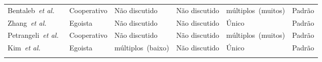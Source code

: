 \begin{table}[htb]
\begin{tabular}{p{2.8cm}p{2cm}p{2.3cm}p{2.2cm}p{2.3cm}p{2cm}}
    Bentaleb~\textit{et al.}~\cite{bentaleb:2018:MSys} &
    Cooperativo & Não discutido & Não discutido & múltiplos~(muitos) & Padrão \\
    \addlinespace
	\addlinespace
	
    Zhang~\textit{et al.}~\cite{zhangINFOCOM17} &
    Egoista & Não discutido & Não discutido & Único & Padrão \\
    \addlinespace
	\addlinespace
	
    Petrangeli~\textit{et al.}~\cite{petrangeli2019IM} &
    Cooperativo & Não discutido & Não discutido & múltiplos~(muitos) & Padrão \\
    \addlinespace
	\addlinespace
	
    Kim~\textit{et al.}~\cite{Kim2018} &
    Egoista & múltiplos~(baixo) & Não discutido & Único & Padrão \\
    \addlinespace
	\addlinespace
	
    \bottomrule
  \end{tabular}
\end{table}
